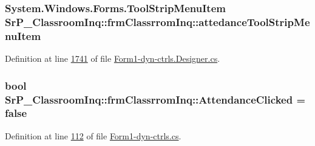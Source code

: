 \hypertarget{class_sr_p___classroom_inq_1_1frm_classrrom_inq_a2ccfb297c675044ba746ce9c6839c2bc}{
\subsubsection[{attedance\-Tool\-Strip\-Menu\-Item}]{\setlength{\rightskip}{0pt plus 5cm}\-System.\-Windows.\-Forms.\-Tool\-Strip\-Menu\-Item {\bf \-Sr\-P\-\_\-\-Classroom\-Inq\-::frm\-Classrrom\-Inq\-::attedance\-Tool\-Strip\-Menu\-Item}}}
\label{class_sr_p___classroom_inq_1_1frm_classrrom_inq_a2ccfb297c675044ba746ce9c6839c2bc}


\-Definition at line \hyperlink{_form1-dyn-ctrls_8_designer_8cs_source_l01741}{1741} of file \hyperlink{_form1-dyn-ctrls_8_designer_8cs_source}{\-Form1-\/dyn-\/ctrls.\-Designer.\-cs}.

\hypertarget{class_sr_p___classroom_inq_1_1frm_classrrom_inq_a319172bf9b9e58ec37499658a5289284}{
\subsubsection[{\-Attendance\-Clicked}]{\setlength{\rightskip}{0pt plus 5cm}bool {\bf \-Sr\-P\-\_\-\-Classroom\-Inq\-::frm\-Classrrom\-Inq\-::\-Attendance\-Clicked} = false}}
\label{class_sr_p___classroom_inq_1_1frm_classrrom_inq_a319172bf9b9e58ec37499658a5289284}


\-Definition at line \hyperlink{_form1-dyn-ctrls_8cs_source_l00112}{112} of file \hyperlink{_form1-dyn-ctrls_8cs_source}{\-Form1-\/dyn-\/ctrls.\-cs}.

